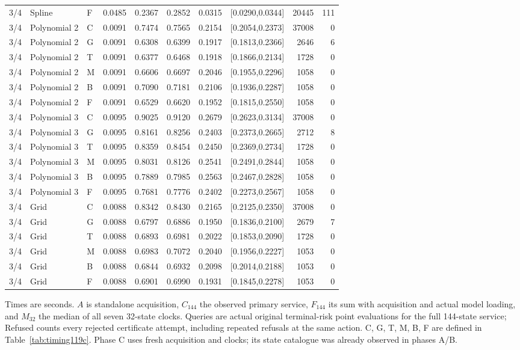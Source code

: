 \begin{longtable}{lllrrrrlrr}
3/4 & Spline & F & 0.0485 & 0.2367 & 0.2852 & 0.0315 & [0.0290,0.0344] & 20445 & 111 \\
3/4 & Polynomial 2 & C & 0.0091 & 0.7474 & 0.7565 & 0.2154 & [0.2054,0.2373] & 37008 & 0 \\
3/4 & Polynomial 2 & G & 0.0091 & 0.6308 & 0.6399 & 0.1917 & [0.1813,0.2366] & 2646 & 6 \\
3/4 & Polynomial 2 & T & 0.0091 & 0.6377 & 0.6468 & 0.1918 & [0.1866,0.2134] & 1728 & 0 \\
3/4 & Polynomial 2 & M & 0.0091 & 0.6606 & 0.6697 & 0.2046 & [0.1955,0.2296] & 1058 & 0 \\
3/4 & Polynomial 2 & B & 0.0091 & 0.7090 & 0.7181 & 0.2106 & [0.1936,0.2287] & 1058 & 0 \\
3/4 & Polynomial 2 & F & 0.0091 & 0.6529 & 0.6620 & 0.1952 & [0.1815,0.2550] & 1058 & 0 \\
3/4 & Polynomial 3 & C & 0.0095 & 0.9025 & 0.9120 & 0.2679 & [0.2623,0.3134] & 37008 & 0 \\
3/4 & Polynomial 3 & G & 0.0095 & 0.8161 & 0.8256 & 0.2403 & [0.2373,0.2665] & 2712 & 8 \\
3/4 & Polynomial 3 & T & 0.0095 & 0.8359 & 0.8454 & 0.2450 & [0.2369,0.2734] & 1728 & 0 \\
3/4 & Polynomial 3 & M & 0.0095 & 0.8031 & 0.8126 & 0.2541 & [0.2491,0.2844] & 1058 & 0 \\
3/4 & Polynomial 3 & B & 0.0095 & 0.7889 & 0.7985 & 0.2563 & [0.2467,0.2828] & 1058 & 0 \\
3/4 & Polynomial 3 & F & 0.0095 & 0.7681 & 0.7776 & 0.2402 & [0.2273,0.2567] & 1058 & 0 \\
3/4 & Grid & C & 0.0088 & 0.8342 & 0.8430 & 0.2165 & [0.2125,0.2350] & 37008 & 0 \\
3/4 & Grid & G & 0.0088 & 0.6797 & 0.6886 & 0.1950 & [0.1836,0.2100] & 2679 & 7 \\
3/4 & Grid & T & 0.0088 & 0.6893 & 0.6981 & 0.2022 & [0.1853,0.2090] & 1728 & 0 \\
3/4 & Grid & M & 0.0088 & 0.6983 & 0.7072 & 0.2040 & [0.1956,0.2227] & 1053 & 0 \\
3/4 & Grid & B & 0.0088 & 0.6844 & 0.6932 & 0.2098 & [0.2014,0.2188] & 1053 & 0 \\
3/4 & Grid & F & 0.0088 & 0.6901 & 0.6990 & 0.1931 & [0.1845,0.2278] & 1053 & 0 \\
\end{longtable}
\noindent Times are seconds. $A$ is standalone acquisition, $C_{144}$ the observed primary service, $F_{144}$ its sum with acquisition and actual model loading, and $M_{32}$ the median of all seven 32-state clocks. Queries are actual original terminal-risk point evaluations for the full 144-state service; Refused counts every rejected certificate attempt, including repeated refusals at the same action. C, G, T, M, B, F are defined in Table~\ref{tab:timing119c}. Phase C uses fresh acquisition and clocks; its state catalogue was already observed in phases A/B.
\endgroup

